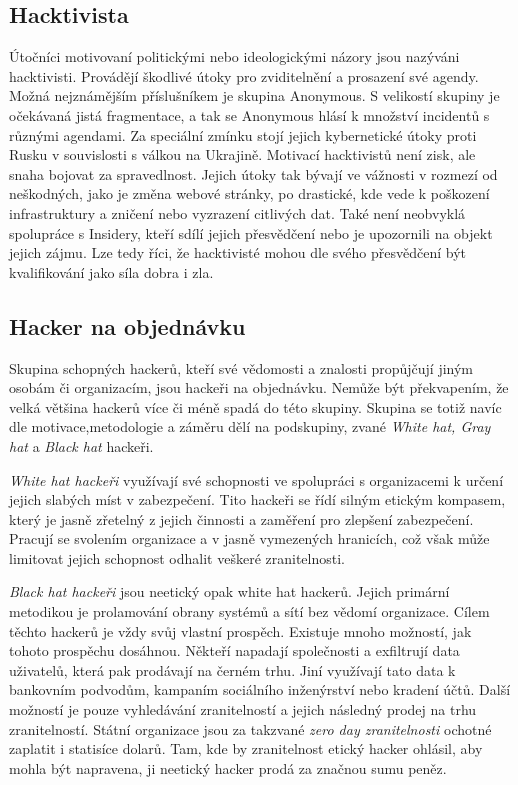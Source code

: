 \subsection{Hacktivista}\label{subsec:hacktivista}
Útočníci motivovaní politickými nebo ideologickými názory jsou nazýváni hacktivisti.
Provádějí škodlivé útoky pro zviditelnění a prosazení své agendy.
Možná nejznámějším příslušníkem je skupina Anonymous.
S velikostí skupiny je očekávaná jistá fragmentace, a tak se Anonymous hlásí k množství incidentů s různými agendami.
Za speciální zmínku stojí jejich kybernetické útoky proti Rusku v souvislosti s válkou na Ukrajině\cite{anonymous_russian_attacks}.
Motivací hacktivistů není zisk, ale snaha bojovat za spravedlnost.
Jejich útoky tak bývají ve vážnosti v rozmezí od neškodných, jako je změna webové stránky, po drastické, kde vede k poškození infrastruktury a zničení nebo vyzrazení citlivých dat.
Také není neobvyklá spolupráce s Insidery, kteří sdílí jejich přesvědčení nebo je upozornili na objekt jejich zájmu.
Lze tedy říci, že hacktivisté mohou dle svého přesvědčení být kvalifikování jako síla dobra i zla.


\subsection{Hacker na objednávku}\label{subsec:hacker-na-objednavku}
Skupina schopných hackerů, kteří své vědomosti a znalosti propůjčují jiným osobám či organizacím, jsou hackeři na objednávku.
Nemůže být překvapením, že velká většina hackerů více či méně spadá do této skupiny.
Skupina se totiž navíc dle motivace,metodologie a záměru dělí na podskupiny, zvané \textit{White hat, Gray hat} a \textit{Black hat} hackeři.

\textit{White hat hackeři} využívají své schopnosti ve spolupráci s organizacemi k určení jejich slabých míst v zabezpečení.
Tito hackeři se řídí silným etickým kompasem, který je jasně zřetelný z jejich činnosti a zaměření pro zlepšení zabezpečení.
Pracují se svolením organizace a v jasně vymezených hranicích, což však může limitovat jejich schopnost odhalit veškeré zranitelnosti.

\textit{Black hat hackeři} jsou neetický opak white hat hackerů.
Jejich primární metodikou je prolamování obrany systémů a sítí bez vědomí organizace.
Cílem těchto hackerů je vždy svůj vlastní prospěch.
Existuje mnoho možností, jak tohoto prospěchu dosáhnou.
Někteří napadají společnosti a exfiltrují data uživatelů, která pak prodávají na černém trhu.
Jiní využívají tato data k bankovním podvodům, kampaním sociálního inženýrství nebo kradení účtů.
Další možností je pouze vyhledávání zranitelností a jejich následný prodej na trhu zranitelností.
Státní organizace jsou za takzvané \textit{zero day zranitelnosti} ochotné zaplatit i statisíce dolarů\cite{world_end_2021}.
Tam, kde by zranitelnost etický hacker ohlásil, aby mohla být napravena, ji neetický hacker prodá za značnou sumu peněz.

